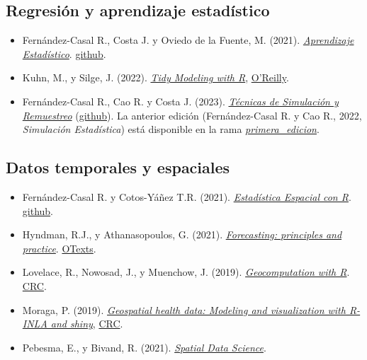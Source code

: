 \documentclass[
]{book}
\theoremstyle{break}
\theoremstyle{nonumberplain}
\begin{document}
\hypertarget{regresiuxf3n-y-aprendizaje-estaduxedstico}{%
\subsection*{Regresión y aprendizaje estadístico}\label{regresiuxf3n-y-aprendizaje-estaduxedstico}}

\begin{itemize}
\item
  Fernández-Casal R., Costa J. y Oviedo de la Fuente, M. (2021). \emph{\href{https://rubenfcasal.github.io/aprendizaje_estadistico}{Aprendizaje Estadístico}}. \href{https://github.com/rubenfcasal/aprendizaje_estadistico}{github}.
\item
  Kuhn, M., y Silge, J. (2022). \emph{\href{https://www.tmwr.org}{Tidy Modeling with R}}, \href{https://www.oreilly.com/library/view/tidy-modeling-with/9781492096474}{O'Reilly}.
\item
  Fernández-Casal R., Cao R. y Costa J. (2023). \emph{\href{https://rubenfcasal.github.io/simbook}{Técnicas de Simulación y Remuestreo}} (\href{https://github.com/rubenfcasal/simbook}{github}). La anterior edición (Fernández-Casal R. y Cao R., 2022, \emph{Simulación Estadística}) está disponible en la rama \emph{\href{https://github.com/rubenfcasal/simbook/tree/primera_edicion}{primera\_edicion}}.
\end{itemize}

\hypertarget{datos-temporales-y-espaciales}{%
\subsection*{Datos temporales y espaciales}\label{datos-temporales-y-espaciales}}

\begin{itemize}
\item
  Fernández-Casal R. y Cotos-Yáñez T.R. (2021). \emph{\href{https://rubenfcasal.github.io/estadistica_espacial}{Estadística Espacial con R}}. \href{https://github.com/rubenfcasal/estadistica_espacial}{github}.
\item
  Hyndman, R.J., y Athanasopoulos, G. (2021). \emph{\href{https://otexts.com/fpp3}{Forecasting: principles and practice}}. \href{https://www.amazon.es/dp/0987507133}{OTexts}.
\item
  Lovelace, R., Nowosad, J., y Muenchow, J. (2019). \emph{\href{https://geocompr.robinlovelace.net}{Geocomputation with R}}. \href{https://www.routledge.com/9781138304512}{CRC}.
\item
  Moraga, P. (2019). \emph{\href{https://www.paulamoraga.com/book-geospatial}{Geospatial health data: Modeling and visualization with R-INLA and shiny}}, \href{https://www.routledge.com/9780367357955}{CRC}.
\item
  Pebesma, E., y Bivand, R. (2021). \emph{\href{https://keen-swartz-3146c4.netlify.app}{Spatial Data Science}}.
\end{itemize}
\end{document}
